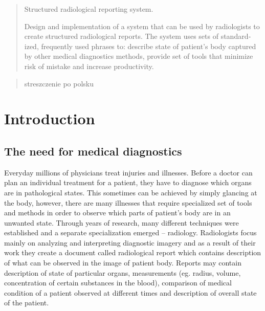 \documentclass[12pt, twoside, openany]{report}
\theoremstyle{definition}
\begin{document}
\thispagestyle{empty}
\newpage
\pagestyle{headings}
\setcounter{page}{1}
\begin{otherlanguage}{british}
\begin{abstract}
Structured radiological reporting system.

Design and implementation of a system that can be used by radiologists to create structured radiological reports. The system uses sets of standardized, frequently used phrases to: describe state of patient's body captured by other medical diagnostics methods, provide set of tools that minimize risk of mistake and increase productivity. 
\end{abstract}
\end{otherlanguage}

\begin{otherlanguage}{polish}
\begin{abstract}
streszczenie po polsku
\end{abstract}
\end{otherlanguage}

\tableofcontents
\clearpage







\chapter{Introduction}
\section{The need for medical diagnostics}
Everyday millions of physicians treat injuries and illnesses. Before a doctor can plan an individual treatment for a patient, they have to diagnose which organs are in pathological states\cite{bls}. This sometimes can be achieved by simply glancing at the body, however, there are many illnesses that require specialized set of tools and methods in order to observe which parts of patient's body are in an unwanted state. Through years of research, many different techniques were established and a separate specialization emerged -- radiology. Radiologists focus mainly on analyzing and interpreting diagnostic imagery and as a result of their work they create a document called radiological report which contains description of what can be observed in the image of patient body. Reports may contain description of state of particular organs, measurements (eg. radius, volume, concentration of certain substances in the blood), comparison of medical condition of a patient observed at different times and description of overall state of the patient. \\
\end{document}
